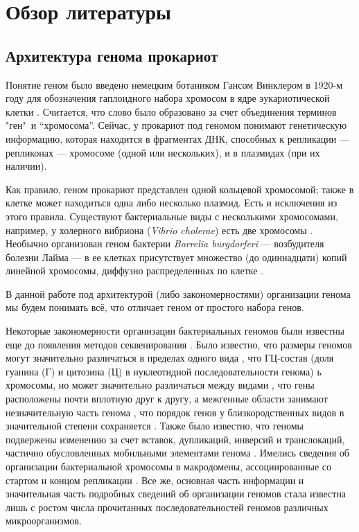 \chapter{Обзор литературы} \label{chapt1}

\section{Архитектура генома прокариот} \label{sect1_1}
Понятие геном было введено немецким ботаником Гансом Винклером в 1920-м году для обозначения гаплоидного набора хромосом в ядре эукариотической клетки \cite{noguera2013genome}. Считается, что слово было образовано за счет объединения терминов "ген"\ и ``хромосома''. Сейчас, у прокариот под геномом понимают генетическую информацию, которая находится в фрагментах ДНК, способных к репликации --- репликонах --- хромосоме (одной или нескольких), и в плазмидах (при их наличии).  

Как правило, геном прокариот представлен одной кольцевой хромосомой; также в клетке может находиться одна либо несколько плазмид. Есть и исключения из этого правила. Существуют бактериальные виды с несколькими хромосомами, например, у холерного вибриона (\textit{Vibrio cholerae}) есть две хромосомы \cite{trucksis1998vibrio}. Необычно организован геном бактерии \textit{Borrelia burgdorferi} --- возбудителя болезни Лайма --- в ее клетках присутствует множество (до одиннадцати) копий линейной хромосомы, диффузно распределенных по клетке \cite{hinnebusch1997bacterial}.

В данной работе под архитектурой (либо закономерностями) организации генома мы будем понимать всё, что отличает геном от простого набора генов. 

Некоторые закономерности организации бактериальных геномов были известны еще до появления методов секвенирования \cite{bobay2017evolution}. Было известно, что размеры геномов могут значительно различаться в пределах одного вида \cite{herdman1985evolution}, что ГЦ-состав (доля гуанина (Г) и цитозина (Ц) в нуклеотидной последовательности генома) ь хромосомы, но может значительно различаться между видами \cite{thomas2008mosaic}, что гены расположены почти вплотную друг к другу, а межгенные области занимают незначительную часть генома \cite{mira2001deletional}, что порядок генов у близкородственных видов в значительной степени сохраняется \cite{rocha2008organization}. Также было известно, что геномы подвержены изменению за счет вставок, дупликаций, инверсий и транслокаций, частично обусловленных мобильными элементами генома \cite{eisen2000evidence}. Имелись сведения об организации бактериальной хромосомы в макродомены, ассоциированные со стартом и концом репликации \cite{boccard2005spatial}. Все же, основная часть информации и значительная часть подробных сведений об организации геномов стала известна лишь с ростом числа прочитанных последовательностей геномов различных микроорганизмов. 

